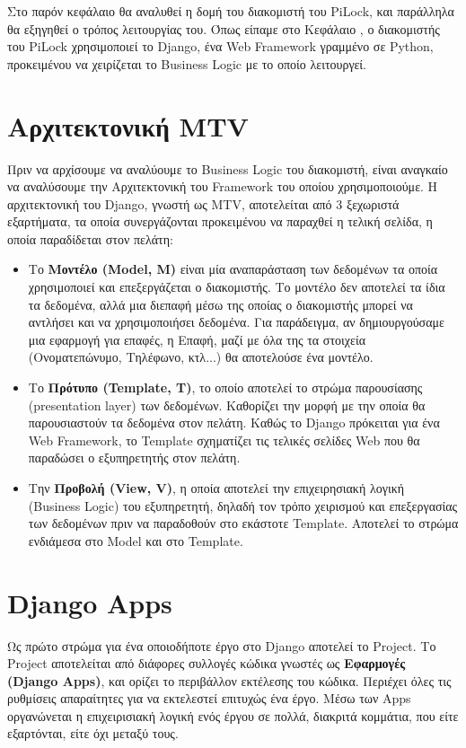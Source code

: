 Στο παρόν κεφάλαιο θα αναλυθεί η δομή του διακομιστή του PiLock, και παράλληλα θα εξηγηθεί ο τρόπος λειτουργίας του. Όπως είπαμε στο Κεφάλαιο , ο διακομιστής του PiLock χρησιμοποιεί το Django, ένα Web Framework γραμμένο σε Python, προκειμένου να χειρίζεται το Business Logic με το οποίο λειτουργεί.

\section{Αρχιτεκτονική MTV}
	\label{sec:mtv_arch}
	Πριν να αρχίσουμε να αναλύουμε το Business Logic του διακομιστή, είναι αναγκαίο να αναλύσουμε την Αρχιτεκτονική του Framework του οποίου χρησιμοποιούμε. Η αρχιτεκτονική του Django, γνωστή ως MTV, αποτελείται από 3 ξεχωριστά εξαρτήματα, τα οποία συνεργάζονται προκειμένου να παραχθεί η τελική σελίδα, η οποία παραδίδεται στον πελάτη:

	\begin{itemize}
		\item Το \textbf{Μοντέλο (Model, M)} είναι μία αναπαράσταση των δεδομένων τα οποία χρησιμοποιεί και επεξεργάζεται ο διακομιστής. Το μοντέλο δεν αποτελεί τα ίδια τα δεδομένα, αλλά μια διεπαφή μέσω της οποίας ο διακομιστής μπορεί να αντλήσει και να χρησιμοποιήσει δεδομένα. Για παράδειγμα, αν δημιουργούσαμε μια εφαρμογή για επαφές, η Επαφή, μαζί με όλα της τα στοιχεία (Ονοματεπώνυμο, Τηλέφωνο, κτλ...) θα αποτελούσε ένα μοντέλο. 
		\item Το \textbf{Πρότυπο (Template, T)}, το οποίο αποτελεί το στρώμα παρουσίασης (presentation layer) των δεδομένων. Καθορίζει την μορφή με την οποία θα παρουσιαστούν τα δεδομένα στον πελάτη. Καθώς το Django πρόκειται για ένα Web Framework, το Template σχηματίζει τις τελικές σελίδες Web που θα παραδώσει ο εξυπηρετητής στον πελάτη.
		\item Την \textbf{Προβολή (View, V)}, η οποία αποτελεί την επιχειρησιακή λογική (Business Logic) του εξυπηρετητή, δηλαδή τον τρόπο χειρισμού και επεξεργασίας των δεδομένων πριν να παραδοθούν στο εκάστοτε Template. Αποτελεί το στρώμα ενδιάμεσα στο Model και στο Template.
	\end{itemize}

\section{Django Apps}
	Ως πρώτο στρώμα για ένα οποιοδήποτε έργο στο Django αποτελεί το Project. Το Project αποτελείται από διάφορες συλλογές κώδικα γνωστές ως \textbf{Εφαρμογές (Django Apps)}, και ορίζει το περιβάλλον εκτέλεσης του κώδικα. Περιέχει όλες τις ρυθμίσεις απαραίτητες για να εκτελεστεί επιτυχώς ένα έργο. Μέσω των Apps οργανώνεται η επιχειρισιακή λογική ενός έργου σε πολλά, διακριτά κομμάτια, που είτε εξαρτόνται, είτε όχι μεταξύ τους.

